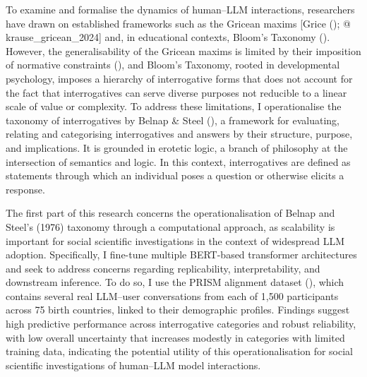 \documentclass[
  12pt,
]{article}
\begin{document}
To examine and formalise the dynamics of human--LLM interactions, researchers have drawn on established frameworks such as the Gricean maxims {[}Grice (); @ krause\_gricean\_2024{]} and, in educational contexts, Bloom's Taxonomy (). However, the generalisability of the Gricean maxims is limited by their imposition of normative constraints (), and Bloom's Taxonomy, rooted in developmental psychology, imposes a hierarchy of interrogative forms that does not account for the fact that interrogatives can serve diverse purposes not reducible to a linear scale of value or complexity. To address these limitations, I operationalise the taxonomy of interrogatives by Belnap \& Steel (), a framework for evaluating, relating and categorising interrogatives and answers by their structure, purpose, and implications. It is grounded in erotetic logic, a branch of philosophy at the intersection of semantics and logic. In this context, interrogatives are defined as statements through which an individual poses a question or otherwise elicits a response.

The first part of this research concerns the operationalisation of Belnap and Steel's (1976) taxonomy through a computational approach, as scalability is important for social scientific investigations in the context of widespread LLM adoption. Specifically, I fine-tune multiple BERT-based transformer architectures and seek to address concerns regarding replicability, interpretability, and downstream inference. To do so, I use the PRISM alignment dataset (), which contains several real LLM--user conversations from each of 1,500 participants across 75 birth countries, linked to their demographic profiles. Findings suggest high predictive performance across interrogative categories and robust reliability, with low overall uncertainty that increases modestly in categories with limited training data, indicating the potential utility of this operationalisation for social scientific investigations of human--LLM model interactions.
\end{document}
